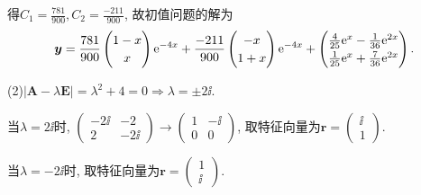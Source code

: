 \begin{solve}
得$C_1=\frac{781}{900},C_2=\frac{-211}{900}$, 故初值问题的解为
\[\bm{y}=\frac{781}{900}\begin{pmatrix}1-x\\x\end{pmatrix}\e^{-4x}+\frac{-211}{900}\begin{pmatrix}-x\\1+x\end{pmatrix}\e^{-4x}+\renewcommand\arraystretch{1.2}
\begin{pmatrix}\frac{4}{25}\e^x-\frac{1}{36}\e^{2x}\\\frac{1}{25}\e^x+\frac{7}{36}\e^{2x}\end{pmatrix}.\]

(2)$|\bm{A}-\lambda\bm{E}|=\lambda^2+4=0\Rightarrow\lambda=\pm2\ii$.

当$\lambda=2\ii$时, $\begin{pmatrix}-2\ii&-2\\2&-2\ii\end{pmatrix}\to\begin{pmatrix}1&-\ii\\0&0\end{pmatrix}$, 
取特征向量为$\bm{r}=\begin{pmatrix}\ii\\1\end{pmatrix}$.

当$\lambda=-2\ii$时, 取特征向量为$\bm{r}=\begin{pmatrix}1\\\ii\end{pmatrix}$.


\end{solve}
